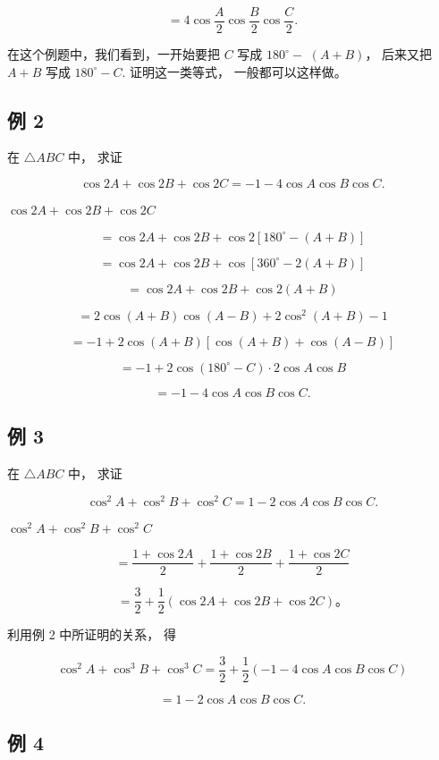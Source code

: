 \[
= 4 \cos \frac {A}{2} \cos \frac {B}{2} \cos \frac {C}{2}.
\]

在这个例题中，我们看到，一开始要把 \(C\) 写成 \(180^{\circ} -\)
\((A + B)\)， 后来又把 \(A + B\) 写成 \(180^{\circ} - C\).
证明这一类等式， 一般都可以这样做。

\subsection{例 2}

在 \(\triangle ABC\) 中， 求证

\[
\cos 2 A + \cos 2 B + \cos 2 C = - 1 - 4 \cos A \cos B \cos C.
\]

 \(\cos 2A + \cos 2B + \cos 2C\)

\[
= \cos 2 A + \cos 2 B + \cos 2 [ 180 ^{\circ} - (A + B) ]
\]

\[
= \cos 2 A + \cos 2 B + \cos [ 360 ^{\circ} - 2 (A + B) ]
\]

\[
= \cos 2 A + \cos 2 B + \cos 2 (A + B)
\]

\[
= 2 \cos (A + B) \cos (A - B) + 2 \cos^ {2} (A + B) - 1
\]

\[
= - 1 + 2 \cos (A + B) [ \cos (A + B) + \cos (A - B) ]
\]

\[
= - 1 + 2 \cos (180 ^{\circ} - C) \cdot 2 \cos A \cos B
\]

\[
= - 1 - 4 \cos A \cos B \cos C.
\]

\subsection{例 3}

在 \(\triangle ABC\) 中， 求证

\[
\cos^ {2} A + \cos^ {2} B + \cos^ {2} C = 1 - 2 \cos A \cos B \cos C.
\]

 \(\cos^2 A + \cos^2 B + \cos^2 C\)

\[
= \frac {1 + \cos 2 A}{2} + \frac {1 + \cos 2 B}{2} + \frac {1 + \cos 2 C}{2}
\]

\[
= \frac {3}{2} + \frac {1}{2} (\cos 2 A + \cos 2 B + \cos 2 C)\text{。}
\]

利用例 2 中所证明的关系， 得

\[
\cos^ {2} A + \cos^ {3} B + \cos^ {3} C = \frac {3}{2} + \frac {1}{2} (- 1 - 4 \cos A \cos B \cos C)
\]

\[
= 1 - 2 \cos A \cos B \cos C.
\]

\subsection{例 4}

